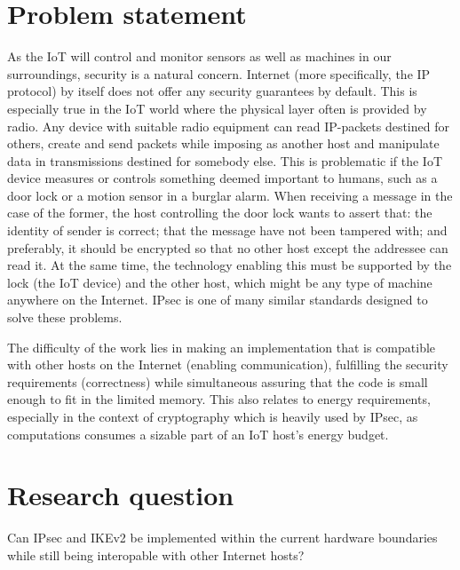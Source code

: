 \documentclass[final,letterpaper,twoside,12pt,twocolumn]{report}
\begin{document}
\section{Problem statement}
As the IoT will control and monitor sensors as well as machines in our surroundings, security is a natural concern. Internet (more specifically, the IP protocol) by itself does not offer any security guarantees by default. This is especially true in the IoT world where the physical layer often is provided by radio. Any device with suitable radio equipment can read IP-packets destined for others, create and send packets while imposing as another host and manipulate data in transmissions destined for somebody else. This is problematic if the IoT device measures or controls something deemed important to humans, such as a door lock or a motion sensor in a burglar alarm. When receiving a message in the case of the former, the host controlling the door lock wants to assert that: the identity of sender is correct; that the message have not been tampered with; and preferably, it should be encrypted so that no other host except the addressee can read it. At the same time, the technology enabling this must be supported by the lock (the IoT device) and the other host, which might be any type of machine anywhere on the Internet. IPsec is one of many similar standards designed to solve these problems.

The difficulty of the work lies in making an implementation that is compatible with other hosts on the Internet (enabling communication), fulfilling the security requirements (correctness) while simultaneous assuring that the code is small enough to fit in the limited memory. This also relates to energy requirements, especially in the context of cryptography which is heavily used by IPsec, as computations consumes a sizable part of an IoT host's energy budget.

\section{Research question}
Can IPsec and IKEv2 be implemented within the current hardware boundaries while still being interopable with other Internet hosts?
 
\end{document}
